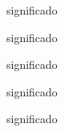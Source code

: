 %	
%	
%	
%

\clearpage


\begin{description}[leftmargin=2cm,style=sameline,font=\normalfont,topsep=0em]
	\item[S]{significado}
	\item[SI]{significado}
	\item[SIG]{significado}
	\item[SIGL]{significado}
	\item[SIGLA]{significado}
\end{description}
